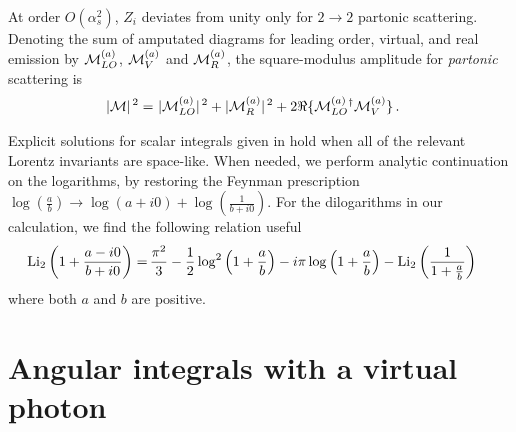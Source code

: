 \documentclass[prd,preprintnumbers,nofootinbib,superscriptaddress,onecolumn,preprint]{revtex4-1}
\newcommand\3[1]{\boldsymbol{#1}}
\begin{document}
At order $O(\alpha_s^2)$, $Z_i$ deviates from unity only for
$2\to2$ partonic scattering. Denoting the sum of amputated
diagrams for leading order, virtual, and real emission by ${\cal
M}_{LO}^{(a)}$, ${\cal M}_V^{(a)}$ and ${\cal M}_R^{(a)}$, the
square-modulus amplitude for \emph{partonic} scattering is
%
\begin{align}
 |{\cal M}|^{\,2}
 =&\,\,  |{\cal M}_{LO}^{(a)}|^{\,2}+|{\cal M}_{R}^{(a)}|^{\,2}
 +2 \Re \{{\cal M}_{LO}^{(a)}{}^{\dagger}{\cal M}_{V}^{(a)}\} \,.
\label{e.amplitudeUVfinite}
\end{align}

Explicit solutions for scalar integrals given in \cite{Ellis:2007qk}
hold when all of the relevant Lorentz invariants are space-like.
When needed, we perform analytic continuation on the
logarithms, by restoring the Feynman prescription
$\log \left(\frac{a}{b}\right) 
  \longrightarrow \log \left(a+i 0\right)+\log \left(\frac{1}{b+i 0}\right)$.
For the dilogarithms in our calculation, we find the following relation useful
\begin{align}
 {\rm Li}_2\left(1+\frac{a-i0}{b+i0}\right) = &
\, \frac{\pi^2}{3}
 -\frac{1}{2}\log^2\left(1+\frac{a}{b}\right)
 -i\pi \log\left(1+\frac{a}{b}\right)
 -{\rm Li}_2\left(\frac{1}{1+\frac{a}{b}}\right)\, 
\end{align}
where both $a$ and $b$ are positive.

\section{Angular integrals with a virtual photon}
\label{a.drv_ecase2}
\end{document}
